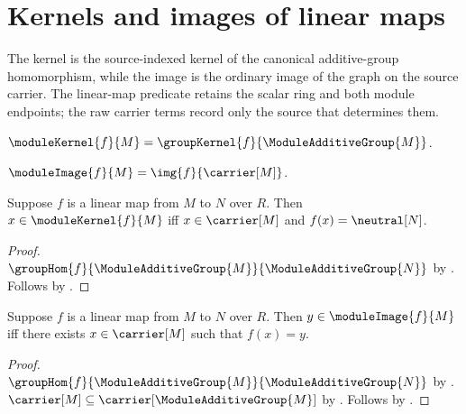 

\section{Kernels and images of linear maps}

The kernel is the source-indexed kernel of the canonical additive-group
homomorphism, while the image is the ordinary image of the graph on the source
carrier.  The linear-map predicate retains the scalar ring and both module
endpoints; the raw carrier terms record only the source that determines them.

\begin{definition}\label{module_kernel}
    $\moduleKernel{f}{M}=\groupKernel{f}{\ModuleAdditiveGroup{M}}$.
\end{definition}

\begin{definition}\label{module_image}
    $\moduleImage{f}{M}=\img{f}{\carrier[M]}$.
\end{definition}

\begin{proposition}\label{module_kernel_iff}
    Suppose $f$ is a linear map from $M$ to $N$ over $R$.
    Then $x\in\moduleKernel{f}{M}$ iff
        $x\in\carrier[M]$ and $f(x)=\neutral[N]$.
\end{proposition}
\begin{proof}
    $\groupHom{f}{\ModuleAdditiveGroup{M}}{
        \ModuleAdditiveGroup{N}}$ by
        .
    Follows by
        .
\end{proof}

\begin{proposition}\label{module_image_iff}
    Suppose $f$ is a linear map from $M$ to $N$ over $R$.
    Then $y\in\moduleImage{f}{M}$ iff
        there exists $x\in\carrier[M]$ such that $f(x)=y$.
\end{proposition}
\begin{proof}
    $\groupHom{f}{\ModuleAdditiveGroup{M}}{
        \ModuleAdditiveGroup{N}}$ by
        .
    $\carrier[M]\subseteq\carrier[\ModuleAdditiveGroup{M}]$ by
        .
    Follows by
        .
\end{proof}


